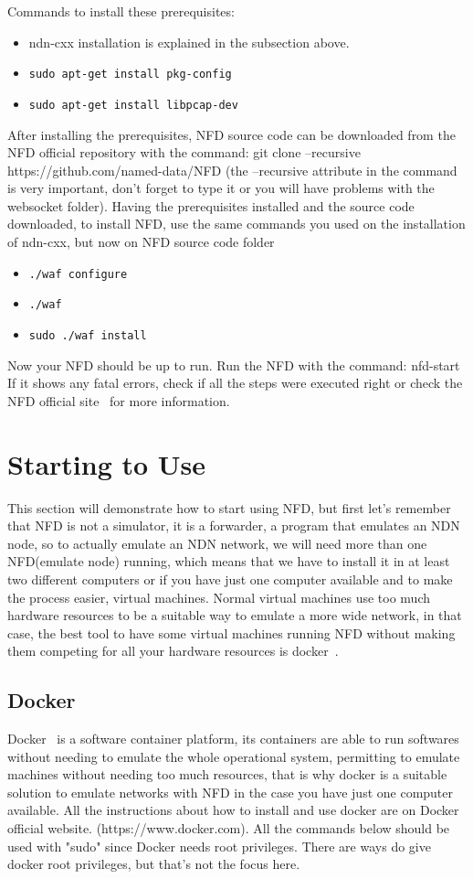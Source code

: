 \documentclass[11pt,conference]{./IEEEtran}
\begin{document}
	Commands to install these prerequisites:
	\begin{itemize}
		\item ndn-cxx installation is explained in the subsection above.
		
		\item \texttt{sudo apt-get install pkg-config}
		
		\item \texttt{sudo apt-get install libpcap-dev}
	\end{itemize}
After installing the prerequisites, NFD source code can be downloaded from the NFD official repository with the command: git clone --recursive https://github.com/named-data/NFD (the --recursive attribute in the command is very important, don't forget to type it or you will have problems with the websocket folder).
Having the prerequisites installed and the source code downloaded, to install NFD, use the same commands you used on the installation of ndn-cxx, but now on NFD source code folder
\begin{itemize}
 \item \texttt{./waf configure} 
 \item \texttt{./waf}
 \item \texttt{sudo ./waf install}
\end{itemize}
Now your NFD should be up to run. Run the NFD with the command: nfd-start
If it shows any fatal errors, check if all the steps were executed right or check the NFD official site~\cite{NFD} for more information. 

\section{Starting to Use}
This section will demonstrate how to start using NFD, but first let's remember that NFD is not a simulator, it is a forwarder, a program that emulates an NDN node, so to actually emulate an NDN network, we will need more than one NFD(emulate node) running, which means that we have to install it in at least two different computers or if you have just one computer available and to make the process easier, virtual machines.
Normal virtual machines use too much hardware resources to be a suitable way to emulate a more wide network, in that case, the best tool to have some virtual machines running NFD without making them competing for all your hardware resources is docker~\cite{docker}. 

\subsection{Docker}
Docker~\cite{docker} is a software container platform, its containers are able to run softwares without needing to emulate the whole operational system, permitting to emulate machines without needing too much resources, that is why docker is a suitable solution to emulate networks with NFD in the case you have just one computer available.
All the instructions about how to install and use docker are on Docker official website. (https://www.docker.com).
All the commands below should be used with "sudo" since Docker needs root privileges. There are ways do give docker root privileges, but that's not the focus here.
\end{document}
